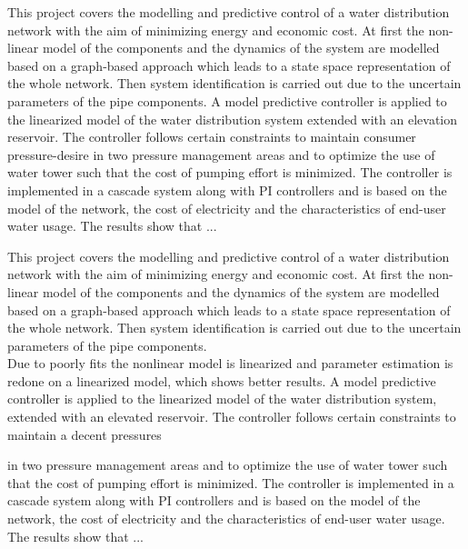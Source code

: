 This project covers the modelling and predictive control of a water distribution network with the aim of minimizing energy and economic cost. 
\newline
At first the non-linear model of the components and the dynamics of the system are modelled based on a graph-based approach which leads to a state space representation of the whole network. Then system identification is carried out due to the uncertain parameters of the pipe components.
\newline
A model predictive controller is applied to the linearized model of the water distribution system extended with an elevation reservoir. The controller follows certain constraints to maintain consumer pressure-desire in two pressure management areas and to optimize the use of water tower such that the cost of pumping effort is minimized. 
The controller is implemented in a cascade system along with PI controllers and is based on the model of the network, the cost of electricity and the characteristics of end-user water usage. 
\newline
The results show that ...









This project covers the modelling and predictive control of a water distribution network with the aim of minimizing energy and economic cost. 
\newline
At first the non-linear model of the components and the dynamics of the system are modelled based on a graph-based approach which leads to a state space representation of the whole network. Then system identification is carried out due to the uncertain parameters of the pipe components.\\
Due to poorly fits the nonlinear model is linearized and parameter estimation is redone on a linearized model, which shows better results.
\newline
A model predictive controller is applied to the linearized model of the water distribution system, extended with an elevated reservoir. The controller follows certain constraints to maintain a decent pressures

 in two pressure management areas and to optimize the use of water tower such that the cost of pumping effort is minimized. 
The controller is implemented in a cascade system along with PI controllers and is based on the model of the network, the cost of electricity and the characteristics of end-user water usage. 
\newline
The results show that ...